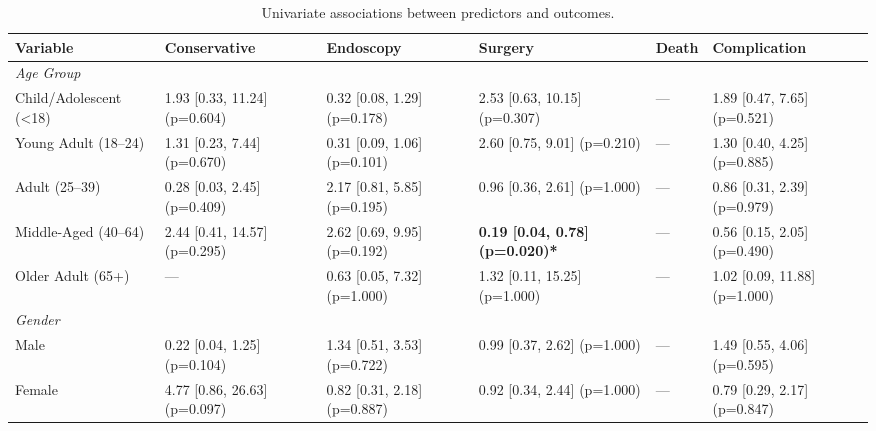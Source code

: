 \begin{table}
\caption{Univariate associations between predictors and outcomes.}
\label{tab:univariate_results}
\centering
\renewcommand{\arraystretch}{1}
\small
\begin{tabular}{p{3.5cm} p{4.1cm} p{4.1cm} p{4.1cm} p{4.1cm} p{4.1cm} }
\toprule
\textbf{Variable} & \textbf{Conservative} & \textbf{Endoscopy} & \textbf{Surgery} & \textbf{Death} & \textbf{Complication} \\
\midrule

\multicolumn{6}{l}{\textit{Age Group}} \\
\hspace{1em}Child/Adolescent (\textless 18) & 1.93 [0.33, 11.24] (p=0.604) & 0.32 [0.08, 1.29] (p=0.178) & 2.53 [0.63, 10.15] (p=0.307) & --- & 1.89 [0.47, 7.65] (p=0.521) \\
\hspace{1em}Young Adult (18–24) & 1.31 [0.23, 7.44] (p=0.670) & 0.31 [0.09, 1.06] (p=0.101) & 2.60 [0.75, 9.01] (p=0.210) & --- & 1.30 [0.40, 4.25] (p=0.885) \\
\hspace{1em}Adult (25–39) & 0.28 [0.03, 2.45] (p=0.409) & 2.17 [0.81, 5.85] (p=0.195) & 0.96 [0.36, 2.61] (p=1.000) & --- & 0.86 [0.31, 2.39] (p=0.979) \\
\hspace{1em}Middle-Aged (40–64) & 2.44 [0.41, 14.57] (p=0.295) & 2.62 [0.69, 9.95] (p=0.192) & \textbf{0.19 [0.04, 0.78] (p=0.020)*} & --- & 0.56 [0.15, 2.05] (p=0.490) \\
\hspace{1em}Older Adult (65+) & --- & 0.63 [0.05, 7.32] (p=1.000) & 1.32 [0.11, 15.25] (p=1.000) & --- & 1.02 [0.09, 11.88] (p=1.000) \\

\multicolumn{6}{l}{\textit{Gender}} \\
\hspace{1em}Male & 0.22 [0.04, 1.25] (p=0.104) & 1.34 [0.51, 3.53] (p=0.722) & 0.99 [0.37, 2.62] (p=1.000) & --- & 1.49 [0.55, 4.06] (p=0.595) \\
\hspace{1em}Female & 4.77 [0.86, 26.63] (p=0.097) & 0.82 [0.31, 2.18] (p=0.887) & 0.92 [0.34, 2.44] (p=1.000) & --- & 0.79 [0.29, 2.17] (p=0.847) \\


\end{tabular}
\end{table}
